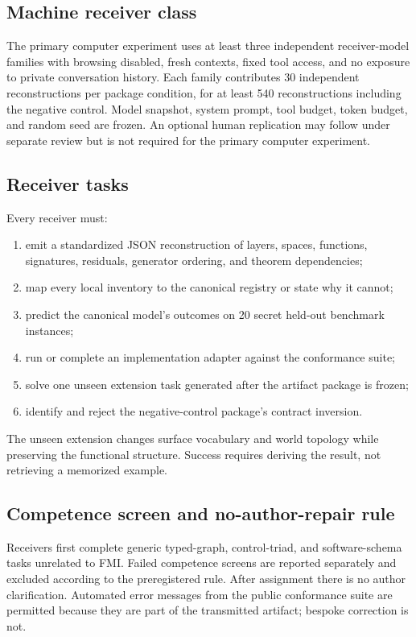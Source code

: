 \documentclass[11pt]{article}
\begin{document}
\subsection{Machine receiver class}

The primary computer experiment uses at least three independent receiver-model families with browsing disabled, fresh contexts, fixed tool access, and no exposure to private conversation history. Each family contributes 30 independent reconstructions per package condition, for at least 540 reconstructions including the negative control. Model snapshot, system prompt, tool budget, token budget, and random seed are frozen. An optional human replication may follow under separate review but is not required for the primary computer experiment.

\subsection{Receiver tasks}

Every receiver must:
\begin{enumerate}
\item emit a standardized JSON reconstruction of layers, spaces, functions, signatures, residuals, generator ordering, and theorem dependencies;
\item map every local inventory to the canonical registry or state why it cannot;
\item predict the canonical model's outcomes on 20 secret held-out benchmark instances;
\item run or complete an implementation adapter against the conformance suite;
\item solve one unseen extension task generated after the artifact package is frozen;
\item identify and reject the negative-control package's contract inversion.
\end{enumerate}
The unseen extension changes surface vocabulary and world topology while preserving the functional structure. Success requires deriving the result, not retrieving a memorized example.

\subsection{Competence screen and no-author-repair rule}

Receivers first complete generic typed-graph, control-triad, and software-schema tasks unrelated to FMI. Failed competence screens are reported separately and excluded according to the preregistered rule. After assignment there is no author clarification. Automated error messages from the public conformance suite are permitted because they are part of the transmitted artifact; bespoke correction is not.
\end{document}
